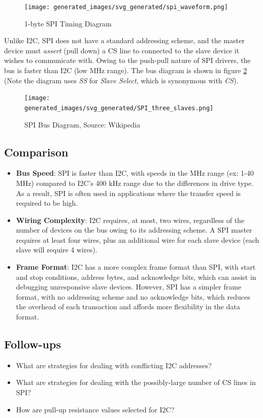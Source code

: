 \documentclass[main.tex]{subfiles}
\begin{document}
\begin{figure}[H]
    \centering
    \texttt{[image: generated\_images/svg\_generated/spi\_waveform.png]}
    \caption{1-byte SPI Timing Diagram}
    \label{fig:spi_timing}
\end{figure}

\noindent Unlike I2C, SPI does not have a standard addressing scheme, and the master device must \textit{assert} (pull down) a CS line to connected to the slave device it wishes to communicate with. Owing to the push-pull nature of SPI drivers, the bus is faster than I2C (low MHz range). The bus diagram is shown in figure \ref{fig:spi_bus} (Note the diagram uses \textit{SS} for \textit{Slave Select}, which is synonymous with \textit{CS}).

\begin{figure}[H]
    \centering
    \texttt{[image: generated\_images/svg\_generated/SPI\_three\_slaves.png]}
    \caption{SPI Bus Diagram, Source: Wikipedia \cite{wikipedia_SPI_bus}}
    \label{fig:spi_bus}
\end{figure}

\subsection{Comparison}
\begin{itemize}
    \item \textbf{Bus Speed}: SPI is faster than I2C, with speeds in the MHz range (ex: 1-40 MHz) compared to I2C's 400 kHz range due to the differences in drive type. As a result, SPI is often used in applications where the transfer speed is required to be high.
    \item \textbf{Wiring Complexity}: I2C requires, at most, two wires, regardless of the number of devices on the bus owing to its addressing scheme. A SPI master requires at least four wires, plus an additional wire for each slave device (each slave will require 4 wires).
    \item \textbf{Frame Format}: I2C has a more complex frame format than SPI, with start and stop conditions, address bytes, and acknowledge bits, which can assist in debugging unresponsive slave devices. However, SPI has a simpler frame format, with no addressing scheme and no acknowledge bits, which reduces the overhead of each transaction and affords more flexibility in the data format.
\end{itemize}

\subsection{Follow-ups}
\begin{itemize}
    \item What are strategies for dealing with conflicting I2C addresses?
    \item What are strategies for dealing with the possibly-large number of CS lines in SPI?
    \item How are pull-up resistance values selected for I2C?
\end{itemize}
\end{document}
